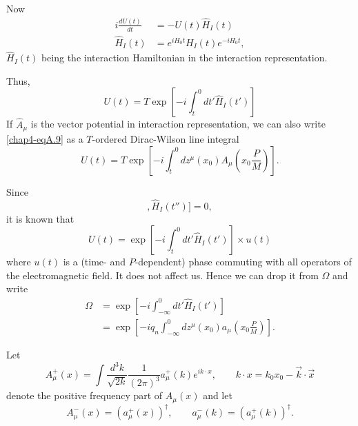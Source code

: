 Now
\begin{align*}
  i \frac{dU(t)}{dt} & = -U (t) \hat{H}_I(t)\\
  \hat{H}_I (t) & = e^{iH_0t} H_I (t) e^{-iH_0t}, \label{chap4-eqA.8}\tag{A.8}
\end{align*}
$\hat{H}_I(t)$ being the interaction Hamiltonian in the interaction representation.

Thus,
\begin{equation*}
U(t)= T\exp \left[-i \int^0_t dt' \hat{H}_I (t') \right]\label{chap4-eqA.9}\tag{A.9}
\end{equation*}
If $\hat{A}_\mu$ is the vector potential in interaction representation, we can also write \eqref{chap4-eqA.9} as a $T$-ordered Dirac-Wilson line integral
\begin{equation*}
U(t) = T \exp \left[-i \int^0_t dz^\mu (x_0) A_\mu  \left( x_0 \frac{P}{M}\right)\right]. \label{chap4-eqA.10}\tag{A.10}
\end{equation*}

Since
\begin{equation*}
  [[\hat{H}_I (t), \hat{H}_I(t')], \hat{H}_I (t'')]=0, \label{chap4-eqA.11}\tag{A.11}
\end{equation*}
it is known that \cite{chap4-key14}
\begin{equation*}
U(t) = \exp \left[ -i \int^0_t dt' \hat{H}_I (t')\right] \times u(t) \label{chap4-eqA.12}\tag{A.12}
\end{equation*}
where $u(t)$ is a (time- and $P$-dependent) phase commuting with all operators of the electromagnetic field. It does not affect us. Hence we can drop it from $\Omega$ and write
\begin{align*}
  \Omega & = \exp \left[-i \int^0_{-\infty} dt' \hat{H}_I (t') \right] \label{chap4-eqA.13}\tag{A.13}\\
  & = \exp \left[ -iq_n \int^0_{-\infty} dz^\mu (x_0) a_\mu \left( x_0 \frac{P}{M}\right)\right]. \label{chap4-eqA.14}\tag{A.14}
\end{align*}

Let
\begin{equation*}
  A_\mu^+ (x) = \int \frac{d^3k}{\sqrt{2k}} \frac{1}{(2\pi)^3}a_\mu^+ (k)e^{ik\cdot x}, \qquad k \cdot x = k_0 x_0- \vec{k} \cdot \vec{x} \label{chap4-eqA.15}\tag{A.15}
\end{equation*}
denote the positive frequency part of $A_\mu(x)$ and let
\begin{equation*}
A_\mu^- (x) = (a_\mu^+ (x))^\dagger, \qquad a_\mu^- (k) = (a_\mu^+ (k))^\dagger. \label{chap4-eqA.16}\tag{A.16}
\end{equation*}

